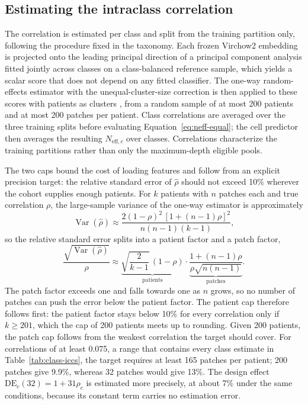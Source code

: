\documentclass[11pt]{article}
\newcommand{\DE}{\mathrm{DE}}
\begin{document}
\subsection{Estimating the intraclass correlation}
\label{sec:icc}
The correlation is estimated per class and split from the training partition only, following the procedure fixed in the taxonomy. Each frozen Virchow2 embedding is projected onto the leading principal direction of a principal component analysis fitted jointly across classes on a class-balanced reference sample, which yields a scalar score that does not depend on any fitted classifier. The one-way random-effects estimator with the unequal-cluster-size correction is then applied to these scores with patients as clusters \citep{kenny1985separating}, from a random sample of at most 200 patients and at most 200 patches per patient. Class correlations are averaged over the three training splits before evaluating Equation~\eqref{eq:neff-equal}; the cell predictor then averages the resulting $N_{\mathrm{eff},c}$ over classes. Correlations characterize the training partitions rather than only the maximum-depth eligible pools.

The two caps bound the cost of loading features and follow from an explicit precision target: the relative standard error of $\widehat\rho$ should not exceed 10\% wherever the cohort supplies enough patients. For $k$ patients with $n$ patches each and true correlation $\rho$, the large-sample variance of the one-way estimator is approximately \citep{donner1986review}
\begin{equation}
  \operatorname{Var}(\widehat\rho)\approx\frac{2(1-\rho)^2\,[1+(n-1)\rho]^2}{n(n-1)(k-1)},
  \label{eq:icc-variance}
\end{equation}
\noindent so the relative standard error splits into a patient factor and a patch factor,
\begin{equation}
  \frac{\sqrt{\operatorname{Var}(\widehat\rho)}}{\rho}\approx
  \underbrace{\sqrt{\frac{2}{k-1}}\,(1-\rho)}_{\text{patients}}
  \cdot
  \underbrace{\frac{1+(n-1)\rho}{\rho\sqrt{n(n-1)}}}_{\text{patches}}.
  \label{eq:icc-relse}
\end{equation}
\noindent The patch factor exceeds one and falls towards one as $n$ grows, so no number of patches can push the error below the patient factor. The patient cap therefore follows first: the patient factor stays below 10\% for every correlation only if $k\ge201$, which the cap of 200 patients meets up to rounding. Given 200 patients, the patch cap follows from the weakest correlation the target should cover. For correlations of at least 0.075, a range that contains every class estimate in Table~\ref{tab:class-iccs}, the target requires at least 165 patches per patient; 200 patches give 9.9\%, whereas 32 patches would give 13\%. The design effect $\DE_c(32)=1+31\rho_c$ is estimated more precisely, at about 7\% under the same conditions, because its constant term carries no estimation error.
\end{document}
